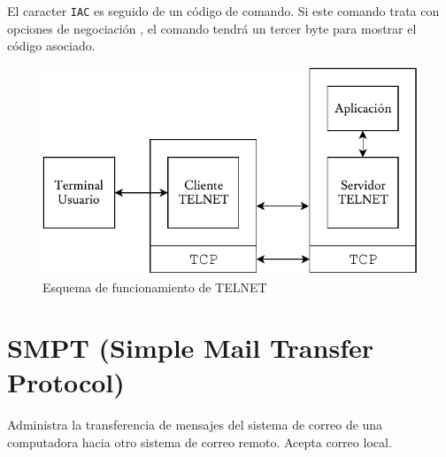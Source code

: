El caracter \texttt{IAC} es seguido de un código de comando. Si este comando trata con opciones de negociación , el comando tendrá un tercer byte para mostrar el código asociado.


\begin{figure}[H]
\centering
\includegraphics[page=1,scale=0.6]{TELNETDiag.pdf}
\caption{Esquema de funcionamiento de TELNET}
\end{figure}

\section*{SMPT (Simple Mail Transfer Protocol)}
Administra la transferencia de mensajes del sistema de correo de una computadora hacia otro sistema de correo remoto. Acepta correo local.
